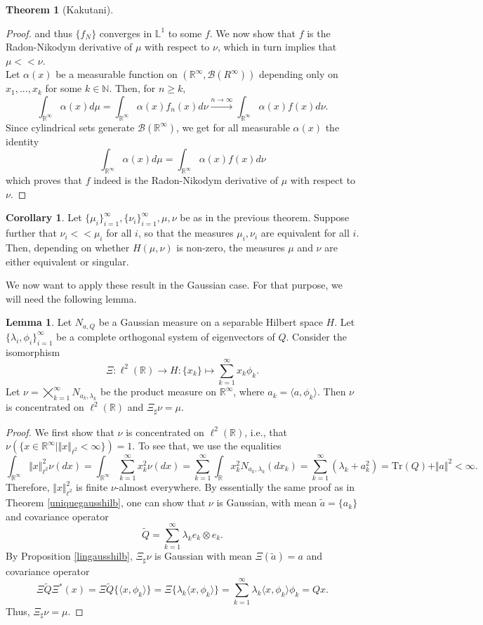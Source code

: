 \documentclass[10pt, a4paper]{report}
\newcommand{\Ll}[0]{\mathbb{L}}
\newcommand{\R}[0]{\mathbb{R}}
\theoremstyle{definition}
\newtheorem{theorem}{Theorem}
\newtheorem{lemma}{Lemma}
\newtheorem{coro}{Corollary}
\theoremstyle{remark}
\begin{document}
\begin{theorem}[Kakutani]
\begin{proof}
		and thus $\{f_N\}$ converges in $\Ll^1$ to some $f$. We now show that $f$ is the Radon-Nikodym derivative of $\mu$ with respect to $\nu$, which in turn implies that $\mu << \nu$.\\
		Let $\alpha(x)$ be a measurable function on $(\R^\infty, \mathcal{B}(R^\infty))$ depending only on $x_1,...,x_k$ for some $k\in \mathbb{N}$. Then, for $n\geq k$,
		$$\int_{\R^\infty} \alpha(x) d\mu = \int_{\R^\infty} \alpha(x) f_n(x) d\nu \stackrel{n\to \infty}{\longrightarrow} \int_{\R^\infty} \alpha(x) f(x) d\nu.$$
		Since cylindrical sets generate $\mathcal{B}(\R^\infty)$, we get for all measurable $\alpha(x)$ the identity
		$$\int_{\R^\infty} \alpha(x) d\mu = \int_{\R^\infty} \alpha(x) f(x) d\nu$$
		which proves that $f$ indeed is the Radon-Nikodym derivative of $\mu$ with respect to $\nu$.
	\end{proof}
\end{theorem}
\begin{coro}\label{coroequiv}
	Let $\{\mu_i \}_{i=1}^\infty, \{\nu_i \}_{i=1}^\infty,\mu,\nu$ be as in the previous theorem. Suppose further that $\nu_i << \mu_i$ for all $i$, so that the measures $\mu_i,\nu_i$ are equivalent for all $i$. Then, depending on whether $H(\mu,\nu)$ is non-zero, the measures $\mu$ and $\nu$ are either equivalent or singular.
\end{coro}
We now want to apply these result in the Gaussian case. For that purpose, we will need the following lemma.
\begin{lemma}
	Let $N_{a,Q}$ be a Gaussian measure on a separable Hilbert space $H$. Let $\{\lambda_i, \phi_i \}_{i=1}^\infty$ be a complete orthogonal system of eigenvectors of $Q$. Consider the isomorphism
	$$\Xi: \ell^2(\R) \to H:\{x_k\} \mapsto \sum_{k=1}^{\infty} x_k\phi_k.$$
	Let $\nu = \bigtimes_{k=1}^\infty N_{a_k,\lambda_k}$ be the product measure on $\R^\infty$, where $a_k=\langle a,\phi_k \rangle$. Then $\nu$ is concentrated on $\ell^2(\R)$ and $\Xi_\sharp\nu = \mu$.
	\begin{proof}
		We first show that $\nu$ is concentrated on $\ell^2(\R)$, i.e., that $\nu\left(\{x\in \R^\infty \mid \Vert x\Vert_{\ell^2}< \infty  \}\right)=1$. To see that, we use the equalities
		$$\int_{\R^\infty} \Vert x \Vert_{\ell^2}^2 \nu(dx) = \int_{\R^\infty} \sum_{k=1}^\infty x_k^2  \nu(dx) = \sum_{k=1}^{\infty} \int_{\R} x_k^2 N_{a_k,\lambda_k}(dx_k) = \sum_{k=1}^{\infty} (\lambda_k+a_k^2) =  \mathrm{Tr}(Q)+\Vert a\Vert^2 < \infty.$$
		Therefore, $\Vert x\Vert^2_{\ell^2}$ is finite $\nu$-almost everywhere. By essentially the same proof as in Theorem \ref{uniquegausshilb}, one can show that $\nu$ is Gaussian, with mean $\tilde{a}=\{a_k\}$ and covariance operator
		$$\tilde{Q} = \sum_{k=1}^\infty \lambda_k e_k \otimes e_k.$$
		By Proposition \ref{lingausshilb}, $\Xi_\sharp\nu$ is Gaussian with mean $\Xi(\tilde{a}) = a$ and covariance operator 
		$$\Xi \tilde{Q} \Xi^*(x) = \Xi \tilde{Q} \{\langle x,\phi_k\rangle \} = \Xi \{\lambda_k\langle x,\phi_k\rangle \} = \sum_{k=1}^{\infty} \lambda_k\langle x,\phi_k\rangle \phi_k = Qx.$$
		Thus, $\Xi_\sharp\nu = \mu$.
	\end{proof}
\end{lemma}
\end{document}
